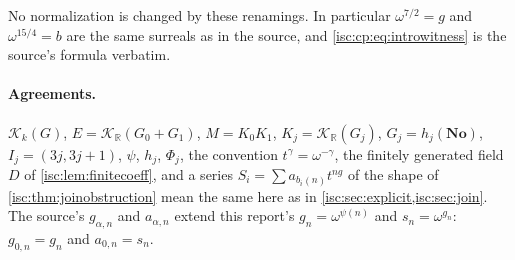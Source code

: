 \documentclass[11pt,letterpaper]{article}
\theoremstyle{definition}
\theoremstyle{remark}
\newcommand{\No}{\mathbf{No}}
\newcommand{\R}{\mathbb R}
\newcommand{\K}[2]{\mathcal K_{#1}(#2)}
\numberwithin{equation}{section}
\begin{document}
No normalization is changed by these renamings. In particular
$\omega^{7/2}=g$ and $\omega^{15/4}=b$ are the same surreals as in the
source, and \eqref{isc:cp:eq:introwitness} is the source's formula verbatim.

\paragraph{Agreements.} $\K{k}{G}$, $E=\K{\R}{G_0+G_1}$, $M=K_0K_1$,
$K_j=\K{\R}{G_j}$, $G_j=h_j(\No)$, $I_j=(3j,3j+1)$, $\psi$, $h_j$, $\Phi_j$,
the convention $t^\gamma=\omega^{-\gamma}$, the finitely generated field $D$
of \cref{isc:lem:finitecoeff}, and a series $S_i=\sum a_{b_i(n)}t^{ng}$ of the
shape of \cref{isc:thm:joinobstruction} mean the same here as in
\cref{isc:sec:explicit,isc:sec:join}. The source's $g_{\alpha,n}$ and
$a_{\alpha,n}$ extend this report's $g_n=\omega^{\psi(n)}$ and
$s_n=\omega^{g_n}$: $g_{0,n}=g_n$ and $a_{0,n}=s_n$.
\end{document}
